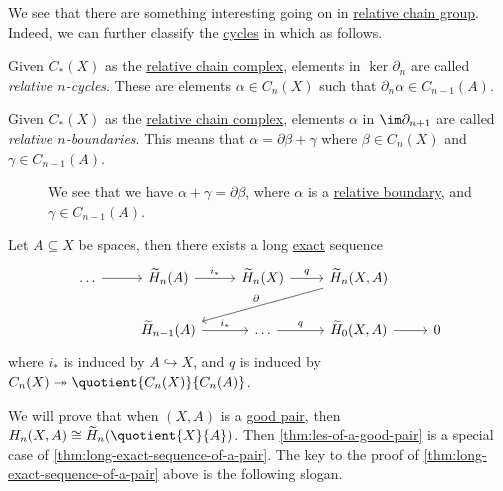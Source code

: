 We see that there are something interesting going on in \hyperref[def:relative-chain-group]{relative chain group}. Indeed, we can further classify the
\hyperref[def:cycle]{cycles} in which as follows.
\begin{definition}\label{def:relative-cycle}
	Given \(C_\ast(X)\) as the \hyperref[def:relative-chain-complex]{relative chain complex}, elements in \(\ker \partial_n\) are called
	\emph{relative \(n\)-cycles}. These are elements \(\alpha \in C_n(X)\) such that \(\partial_n\alpha \in C_{n - 1}(A)\).
	\begin{figure}[H]
		\centering
		\label{fig:def:relative-homology-1}
	\end{figure}
\end{definition}
\begin{definition}\label{def:relative-boundary}
	Given \(C_\ast(X)\) as the \hyperref[def:relative-chain-complex]{relative chain complex}, elements \(\alpha\) in \(\im \partial_{n + 1}\)
	are called \emph{relative \(n\)-boundaries}. This means that \(\alpha = \partial \beta + \gamma\) where \(\beta \in C_n(X)\) and \(\gamma \in C_{n - 1}(A)\).
	\begin{figure}[H]
		\centering
		\caption{We see that we have \(\alpha +\gamma =\partial \beta \), where \(\alpha \) is a \hyperref[def:relative-boundary]{relative boundary},
			and \(\gamma \in C_{n-1}(A)\).}
		\label{fig:def:relative-homology-2}
	\end{figure}
\end{definition}

\begin{theorem}\label{thm:long-exact-sequence-of-a-pair}
	Let \(A \subseteq X\) be spaces, then there exists a long \hyperref[def:exact]{exact} sequence
	\[
		\begin{tikzcd}
			{\ldots} & {\widetilde{H}_n(A)} & {\widetilde{H}_n(X)} & {\widetilde{H}_n(X, A)} \\
			& {\widetilde{H}_{n-1}(A)} & \ldots & {\widetilde{H}_{0}(X, A)} & 0
			\arrow[from=1-1, to=1-2]
			\arrow["{i_\ast}", from=1-2, to=1-3]
			\arrow["q", from=1-3, to=1-4]
			\arrow[from=2-4, to=2-5]
			\arrow["{q}", from=2-3, to=2-4]
			\arrow["{i_\ast}", from=2-2, to=2-3]
			\arrow["{\partial}"', from=1-4, to=2-2]
		\end{tikzcd}
	\]
	where \(i_\ast\) is induced by \(A\hookrightarrow X\), and \(q\) is induced by \(C_{n} (X)\twoheadrightarrow \quotient{C_{n} (X)}{C_{n} (A)}\).
\end{theorem}
We will prove that when \((X, A)\) is a \hyperref[def:good-pair]{good pair}, then \(H_n(X, A) \cong \widetilde{H}_n(\quotient{X}{A})\). Then \autoref{thm:les-of-a-good-pair}
is a special case of \autoref{thm:long-exact-sequence-of-a-pair}. The key to the proof of \autoref{thm:long-exact-sequence-of-a-pair} above is the following slogan.


